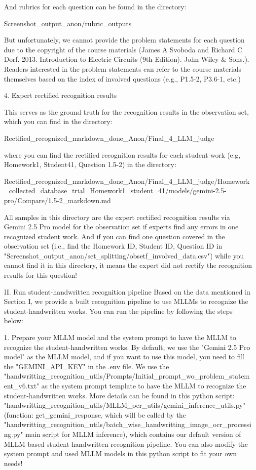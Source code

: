 And rubrics for each question can be found in the directory:

Screenshot_output_anon/rubric_outputs

But unfortunately, we cannot provide the problem statements for each question due to the copyright of the course materials (James A Svoboda and Richard C Dorf. 2013. Introduction to Electric Circuits (9th Edition). John Wiley & Sons.). Readers interested in the problem statements can refer to the course materials themselves based on the index of involved questions (e.g., P1.5-2, P3.6-1, etc.)

4. Expert rectified recognition results

This serves as the ground truth for the recognition results in the observation set, which you can find in the directory: 

Rectified_recognized_markdown_done_Anon/Final_4_LLM_judge

where you can find the rectified recognition results for each student work (e.g, Homework1, Student41, Question 1.5-2) in the directory:

Rectified_recognized_markdown_done_Anon/Final_4_LLM_judge/Homework_collected_database_trial_Homework1_student_41/models/gemini-2.5-pro/Compare/1.5-2_markdown.md

All samples in this directory are the expert rectified recognition results via Gemini 2.5 Pro model for the observation set if experts find any errors in one recognized student work. And if you can find one question covered in the observation set (i.e., find the Homework ID, Student ID, Question ID in "Screenshot_output_anon/set_splitting/obsetf_involved_data.csv") while you cannot find it in this directory, it means the expert did not rectify the recognition results for this question!

II. Run student-handwritten recognition pipeline
Based on the data mentioned in Section I, we provide a built recognition pipeline to use MLLMs to recognize the student-handwritten works. You can run the pipeline by following the steps below:

1. Prepare your MLLM model and the system prompt to have the MLLM to recognize the student-handwritten works.
By default, we use the "Gemini 2.5 Pro model" as the MLLM model, and if you want to use this model, you need to fill the "GEMINI_API_KEY" in the .env file. We use the "handwritting_recognition_utils/Prompts/Initial_prompt_wo_problem_statement_v6.txt" as the system prompt template to have the MLLM to recognize the student-handwritten works. More details can be found in this python script: "handwritting_recognition_utils/MLLM_ocr_utils/gemini_inference_utils.py" (function: get_gemini_response, which will be called by the "handwritting_recognition_utils/batch_wise_handwritting_image_ocr_processing.py" main script for MLLM inference), which contains our default version of MLLM-based student-handwritten recognition pipeline. You can also modify the system prompt and used MLLM models in this python script to fit your own needs!

